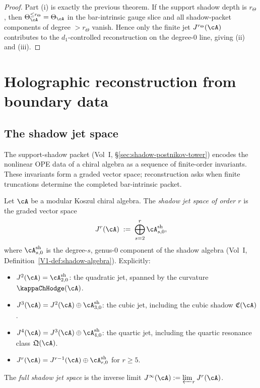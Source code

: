 \begin{proof}
Part \textup{(i)} is exactly the previous theorem. If the support
shadow depth is \(r_\Theta\), then
\(\Theta_\cA^{\leq r_\Theta}=\Theta_\cA\) in the bar-intrinsic gauge
slice and all shadow-packet components of degree \(>r_\Theta\) vanish.
Hence only the finite jet
\(J^{r_\Theta}(\cA)\) contributes to the $d_1$-controlled reconstruction on the
degree-$0$ line, giving \textup{(ii)} and \textup{(iii)}.
\end{proof}



\section{Holographic reconstruction from boundary data}

\subsection{The shadow jet space}

The support-shadow packet (Vol~I, \S\ref*{sec:shadow-postnikov-tower}) encodes the nonlinear
OPE data of a chiral algebra as a sequence of finite-order invariants.
These invariants form a graded vector space; reconstruction asks when
finite truncations determine the completed bar-intrinsic packet.

\begin{definition}
Let $\cA$ be a modular Koszul chiral algebra. The \emph{shadow jet space of order $r$}
is the graded vector space
\begin{equation}
J^r(\cA)
\;:=\;
\bigoplus_{s=2}^{r} \cA^{\mathrm{sh}}_{s,0},
\end{equation}
where $\cA^{\mathrm{sh}}_{s,0}$ is the degree-$s$, genus-$0$ component of the shadow
algebra (Vol~I, Definition~\ref*{V1-def:shadow-algebra}). Explicitly:
\begin{itemize}
\item $J^2(\cA) = \cA^{\mathrm{sh}}_{2,0}$: the quadratic jet, spanned by the curvature
 $\kappaChHodge(\cA)$.
\item $J^3(\cA) = J^2(\cA) \oplus \cA^{\mathrm{sh}}_{3,0}$: the cubic jet, including the
 cubic shadow $\mathfrak{C}(\cA)$.
\item $J^4(\cA) = J^3(\cA) \oplus \cA^{\mathrm{sh}}_{4,0}$: the quartic jet, including
 the quartic resonance class $\mathfrak{Q}(\cA)$.
\item $J^r(\cA) = J^{r-1}(\cA) \oplus \cA^{\mathrm{sh}}_{r,0}$ for $r \geq 5$.
\end{itemize}
The \emph{full shadow jet space} is the inverse limit
$J^\infty(\cA) := \varprojlim_r J^r(\cA)$.
\end{definition}

